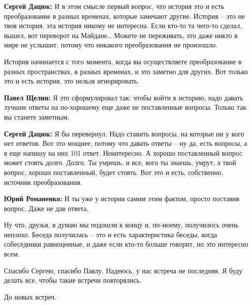 \textbf{Сергей Дацюк:} И в этом смысле первый вопрос, что история это и есть
преобразование в разных временах, которые замечают другие. История – это не
твоя история, эта история никому не интересна. Если кто-то та чего-то сделал,
вышел, вот переворот на Майдане… Можете не переживать, это даже никто в мире не
услышит, потому что никакого преобразования не произошло.

История начинается с того момента, когда вы осуществляете преобразование в
разных пространствах, в разных временах, и это заметно для других. Вот только
это и есть история. это нельзя игнорировать.

\textbf{Павел Щелин:} Я это сформулировал так: чтобы войти в историю, надо давать лучшие
ответы на по-хорошему еще даже не поставленные вопросы. Только так вы станете
заметным.

\textbf{Сергей Дацюк:} Я бы перевернул. Надо ставить вопросы, на которые ни у кого нет
ответов. Вот это мощнее, потому что давать ответы – ну да, есть вопросы, а я
еще напишу на них 101 ответ. Неинтересно. А хорошо поставленный вопрос может
стоять долго. Долго. Ты умрешь, и все, кого ты знаешь, умрут, а твой вопрос,
хорошо поставленный, будет стоять. Вот это и есть, собственно, источник
преобразования.

\textbf{Юрий Романенко:} И ты уже у истории самим этим фактом, просто поставив вопрос.
Даже не дав ответа.

Ну что, друзья, я думаю мы подошли к концу и, по-моему, получилось очень
неплохо. Беседа получилась – это и есть характеристика беседы, когда
собеседники равноценные, и даже если кто-то больше говорит, но это интересно
всем.

Спасибо Сергею, спасибо Павлу. Надеюсь, у нас встреча не последняя. Я буду
делать все, чтобы такие встречи повторялись.

До новых встреч. 
